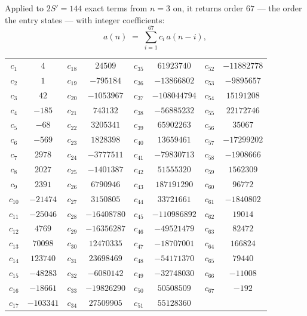 \documentclass[11pt,a4paper]{article}
\theoremstyle{plain}
\theoremstyle{definition}
\begin{document}
Applied to $2S'=144$ exact terms from $n=3$ on, it returns order $67$ --- the
order the entry states --- with integer coefficients:
\[
a(n)\;=\;\sum_{i=1}^{67}c_i\,a(n-i),
\]
\begin{center}\small
\begin{tabular}{cccccccc}
$c_{1}$ & $4$ & $c_{18}$ & $24509$ & $c_{35}$ & $61923740$ & $c_{52}$ & $-11882778$ \\
$c_{2}$ & $1$ & $c_{19}$ & $-795184$ & $c_{36}$ & $-13866802$ & $c_{53}$ & $-9895657$ \\
$c_{3}$ & $42$ & $c_{20}$ & $-1053967$ & $c_{37}$ & $-108044794$ & $c_{54}$ & $15191208$ \\
$c_{4}$ & $-185$ & $c_{21}$ & $743132$ & $c_{38}$ & $-56885232$ & $c_{55}$ & $22172746$ \\
$c_{5}$ & $-68$ & $c_{22}$ & $3205341$ & $c_{39}$ & $65902263$ & $c_{56}$ & $35067$ \\
$c_{6}$ & $-569$ & $c_{23}$ & $1828398$ & $c_{40}$ & $13659461$ & $c_{57}$ & $-17299202$ \\
$c_{7}$ & $2978$ & $c_{24}$ & $-3777511$ & $c_{41}$ & $-79830713$ & $c_{58}$ & $-1908666$ \\
$c_{8}$ & $2027$ & $c_{25}$ & $-1401387$ & $c_{42}$ & $51555320$ & $c_{59}$ & $1562309$ \\
$c_{9}$ & $2391$ & $c_{26}$ & $6790946$ & $c_{43}$ & $187191290$ & $c_{60}$ & $96772$ \\
$c_{10}$ & $-21474$ & $c_{27}$ & $3150805$ & $c_{44}$ & $33721661$ & $c_{61}$ & $-1840802$ \\
$c_{11}$ & $-25046$ & $c_{28}$ & $-16408780$ & $c_{45}$ & $-110986892$ & $c_{62}$ & $19014$ \\
$c_{12}$ & $4769$ & $c_{29}$ & $-16356287$ & $c_{46}$ & $-49521479$ & $c_{63}$ & $82472$ \\
$c_{13}$ & $70098$ & $c_{30}$ & $12470335$ & $c_{47}$ & $-18707001$ & $c_{64}$ & $166824$ \\
$c_{14}$ & $123740$ & $c_{31}$ & $23698469$ & $c_{48}$ & $-54171370$ & $c_{65}$ & $79440$ \\
$c_{15}$ & $-48283$ & $c_{32}$ & $-6080142$ & $c_{49}$ & $-32748030$ & $c_{66}$ & $-11008$ \\
$c_{16}$ & $-18661$ & $c_{33}$ & $-19826290$ & $c_{50}$ & $50508509$ & $c_{67}$ & $-192$ \\
$c_{17}$ & $-103341$ & $c_{34}$ & $27509905$ & $c_{51}$ & $55128360$ &  &  \\
\end{tabular}
\end{center}
\end{document}
